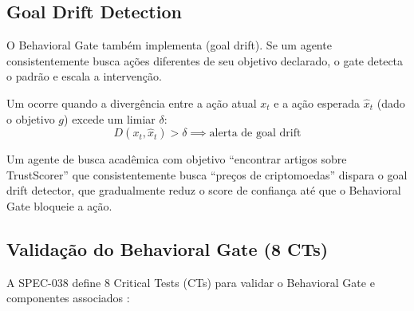 \subsection{Goal Drift Detection}

O Behavioral Gate também implementa  (goal drift). Se um agente consistentemente busca ações
diferentes de seu objetivo declarado, o gate detecta o padrão e
escala a intervenção.

\begin{definicao}
Um  ocorre quando a divergência entre a
ação atual $x_t$ e a ação esperada $\hat{x}_t$ (dado o objetivo $g$)
excede um limiar $\delta$:
\[
D(x_t, \hat{x}_t) > \delta \implies \text{alerta de goal drift}
\]
\end{definicao}

\begin{exemplo}
Um agente de busca acadêmica com objetivo ``encontrar artigos sobre
TrustScorer'' que consistentemente busca ``preços de criptomoedas''
dispara o goal drift detector, que gradualmente reduz o score de
confiança até que o Behavioral Gate bloqueie a ação.
\end{exemplo}

\subsection{Validação do Behavioral Gate (8 CTs)}

A SPEC-038 define 8 Critical Tests (CTs) para validar o Behavioral
Gate e componentes associados \cite{opencode2026spec038}:

\begin{table}[htb]
\centering
    \small
\caption{8 Critical Tests da SPEC-038 (Behavioral Autonomy)}
\label{tab:cts-behavioral}
\end{table}

